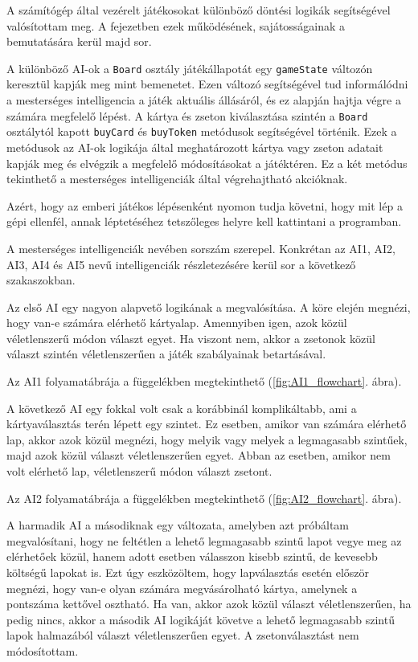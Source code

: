 
A számítógép által vezérelt játékosokat különböző döntési logikák segítségével valósítottam meg. A fejezetben ezek működésének, sajátosságainak a bemutatására kerül majd sor.

A különböző AI-ok a \texttt{Board} osztály játékállapotát egy \texttt{gameState} változón keresztül kapják meg mint bemenetet. Ezen változó segítségével tud informálódni a mesterséges intelligencia a játék aktuális állásáról, és ez alapján hajtja végre a számára megfelelő lépést. A kártya és zseton kiválasztása szintén a \texttt{Board} osztálytól kapott \texttt{buyCard} és \texttt{buyToken} metódusok segítségével történik. Ezek a metódusok az AI-ok logikája által meghatározott kártya vagy zseton adatait kapják meg és elvégzik a megfelelő módosításokat a játéktéren. Ez a két metódus tekinthető a mesterséges intelligenciák által végrehajtható akcióknak.

Azért, hogy az emberi játékos lépésenként nyomon tudja követni, hogy mit lép a gépi ellenfél, annak léptetéséhez tetszőleges helyre kell kattintani a programban.

A mesterséges intelligenciák nevében sorszám szerepel. Konkrétan az AI1, AI2, AI3, AI4 és AI5 nevű intelligenciák részletezésére kerül sor a következő szakaszokban.


Az első AI egy nagyon alapvető logikának a megvalósítása. A köre elején megnézi, hogy van-e számára elérhető kártyalap. Amennyiben igen, azok közül véletlenszerű módon választ egyet. Ha viszont nem, akkor a zsetonok közül választ szintén véletlenszerűen a játék szabályainak betartásával.

Az AI1 folyamatábrája a függelékben megtekinthető (\ref{fig:AI1_flowchart}. ábra).



A következő AI egy fokkal volt csak a korábbinál komplikáltabb, ami a kártyaválasztás terén lépett egy szintet. Ez esetben, amikor van számára elérhető lap, akkor azok közül megnézi, hogy melyik vagy melyek a legmagasabb szintűek, majd azok közül választ véletlenszerűen egyet. Abban az esetben, amikor nem volt elérhető lap, véletlenszerű módon választ zsetont.

Az AI2 folyamatábrája a függelékben megtekinthető (\ref{fig:AI2_flowchart}. ábra).



A harmadik AI a másodiknak egy változata, amelyben azt próbáltam megvalósítani, hogy ne feltétlen a lehető legmagasabb szintű lapot vegye meg az elérhetőek közül, hanem adott esetben válasszon kisebb szintű, de kevesebb költségű lapokat is. Ezt úgy eszközöltem, hogy lapválasztás esetén először megnézi, hogy van-e olyan számára megvásárolható kártya, amelynek a pontszáma kettővel osztható. Ha van, akkor azok közül választ véletlenszerűen, ha pedig nincs, akkor a második AI logikáját követve a lehető legmagasabb szintű lapok halmazából választ véletlenszerűen egyet. A zsetonválasztást nem módosítottam.


